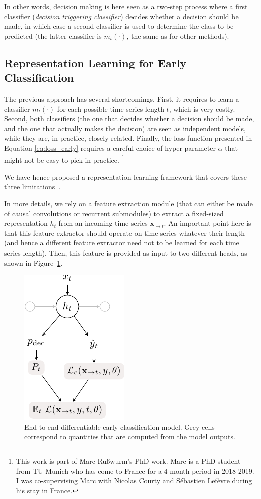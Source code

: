 In other words, decision making is here seen as a two-step process where a
first classifier (\emph{decision triggering classifier}) decides whether a decision
should be made, in which case a
second classifier is used to determine the class to be predicted (the latter
classifier is $m_t(\cdot)$, the same as for other methods).

\subsection{Representation Learning for Early Classification}

The previous approach has several shortcomings.
First, it requires to learn a classifier $m_t(\cdot)$ for each possible time
series length $t$, which is very costly.
Second, both classifiers (the one that decides whether a decision should be
made, and the one that actually makes the decision) are seen as independent
models, while they are, in practice, closely related.
Finally, the loss function presented in Equation \eqref{eq:loss_early} requires
a careful choice of hyper-parameter $\alpha$ that might not be easy to pick in
practice.%
\footnote{This work is part of Marc Rußwurm's PhD work.
Marc is a PhD student from TU Munich who has come to France for a
4-month period in 2018-2019. I was co-supervising Marc with Nicolas Courty
and Sébastien Lefèvre during his stay in France.}

We have hence proposed a representation learning framework that
covers these three limitations~\cite{ruwurm:hal-02174314}.

In more details, we rely on a feature extraction module (that can either be
made of causal convolutions or recurrent submodules) to extract a fixed-sized
representation $h_t$ from an incoming time series $\mathbf{x}_{\rightarrow t}$.
An important point here is that this feature extractor should operate on time
series whatever their length (and hence a different feature extractor need not
to be learned for each time series length).
Then, this feature is provided as input to two different heads, as shown in
Figure~\ref{fig:early}.

\begin{figure}[t]
\centering
\includegraphics[width=.3\textwidth]{fig/early_module_cropped}
\caption{End-to-end differentiable early classification model.
Grey cells correspond to quantities that are
computed from the model outputs. \label{fig:early}}
\end{figure}

